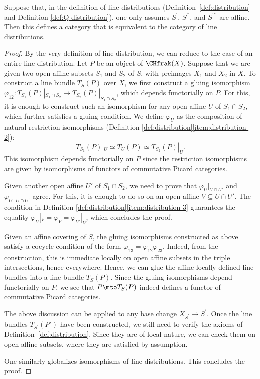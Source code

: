 \begin{proposition}\label{prop:line-distribution-affine}
Suppose that, in the definition of line distributions (\cf Defini\-tion~\ref{def:distribution} and Definition \ref{def:Q-distribution}), one only assumes $S^{\prime}$, $S^{\prime\prime}$, and $S^{\prime\prime\prime}$ are affine. Then this defines a category that is equivalent to the category of line distributions.
\end{proposition}

\begin{proof}
By the very definition of line distribution, we can reduce to the case of an entire line distribution. Let $P$ be an object of $\CHfrak(X)$. Suppose that we are given two open affine subsets $S_1$ and $S_2$ of $S$, with preimages $X_{1}$ and $X_{2}$ in $X$. To construct a line bundle $T_{S}(P)$ over $X$, we first construct a gluing isomorphism $\varphi_{12}: T_{S_{1}}(P)|_{S_{1}\cap S_{2}} \to T_{S_2}(P)|_{S_{1}\cap S_{2}}$, which depends functorially on $P$. For this, it is enough to construct such an isomorphism for any open affine $U$ of $S_{1} \cap S_{2}$, which further satisfies a gluing condition. We define $\varphi_U$ as the composition of natural restriction isomorphisms (\cf Definition \ref{def:distribution}\eqref{item:distribution-2}):\vspace*{-3pt}
\begin{displaymath}
T_{S_1}(P)|_U \simeq T_{U}(P) \simeq T_{S_2}(P)|_U.
\end{displaymath}
This isomorphism depends functorially on $P$ since the restriction isomorphisms are given by isomorphisms of functors of commutative Picard categories.

Given another open affine $U'$ of $S_{1} \cap S_{2}$, we need to prove that $\varphi_{U}|_{U \cap U'}$ and $\varphi_{U'}|_{U \cap U'}$ agree. For this, it is enough to do so on an open affine $V \subseteq U \cap U'$. The condition in Definition \ref{def:distribution}\eqref{item:distribution-3} guarantees the equality $\varphi_U|_V = \varphi_V = \varphi_{U'}|_V$, which concludes the proof.

Given an affine covering of $S$, the gluing isomorphisms constructed as above satisfy a cocycle condition of the form $\varphi_{13} = \varphi_{12} \varphi_{23}$. Indeed, from the construction, this is immediate locally on open affine subsets in the triple intersections, hence everywhere. Hence, we can glue the affine locally defined line bundles into a line bundle $T_{S}(P)$. Since the gluing isomorphisms depend functorially on $P$, we see that $P\mto T_{S}(P)$ indeed defines a functor of commutative Picard categories.

The above discussion can be applied to any base change $X_{S^{\prime}}\to S^{\prime}$. Once the line bundles $T_{S^{\prime}}(P')$ have been constructed, we still need to verify the axioms of Definition~\ref{def:distribution}. Since they are of local nature, we can check them on open affine subsets, where they are satisfied by assumption.

One similarly globalizes isomorphisms of line distributions. This concludes the proof.
\end{proof}

